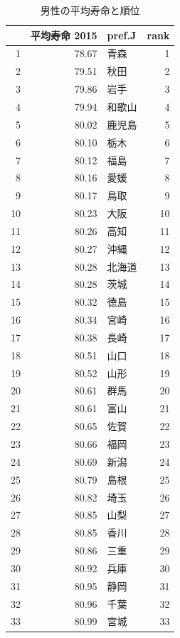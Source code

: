 \begin{table}[ht]
\caption{男性の平均寿命と順位}
\centering
\footnotesize
\begin{tabular}{rrlr}
  \hline
 & 平均寿命 2015 & pref.J & rank \\
  \hline
1 & 78.67 & 青森 &   1 \\
  2 & 79.51 & 秋田 &   2 \\
  3 & 79.86 & 岩手 &   3 \\
  4 & 79.94 & 和歌山 &   4 \\
  5 & 80.02 & 鹿児島 &   5 \\
  6 & 80.10 & 栃木 &   6 \\
  7 & 80.12 & 福島 &   7 \\
  8 & 80.16 & 愛媛 &   8 \\
  9 & 80.17 & 鳥取 &   9 \\
  10 & 80.23 & 大阪 &  10 \\
  11 & 80.26 & 高知 &  11 \\
  12 & 80.27 & 沖縄 &  12 \\
  13 & 80.28 & 北海道 &  13 \\
  14 & 80.28 & 茨城 &  14 \\
  15 & 80.32 & 徳島 &  15 \\
  16 & 80.34 & 宮崎 &  16 \\
  17 & 80.38 & 長崎 &  17 \\
  18 & 80.51 & 山口 &  18 \\
  19 & 80.52 & 山形 &  19 \\
  20 & 80.61 & 群馬 &  20 \\
  21 & 80.61 & 富山 &  21 \\
  22 & 80.65 & 佐賀 &  22 \\
  23 & 80.66 & 福岡 &  23 \\
  24 & 80.69 & 新潟 &  24 \\
  25 & 80.79 & 島根 &  25 \\
  26 & 80.82 & 埼玉 &  26 \\
  27 & 80.85 & 山梨 &  27 \\
  28 & 80.85 & 香川 &  28 \\
  29 & 80.86 & 三重 &  29 \\
  30 & 80.92 & 兵庫 &  30 \\
  31 & 80.95 & 静岡 &  31 \\
  32 & 80.96 & 千葉 &  32 \\
  33 & 80.99 & 宮城 &  33 \\

\end{tabular}
\end{table}
